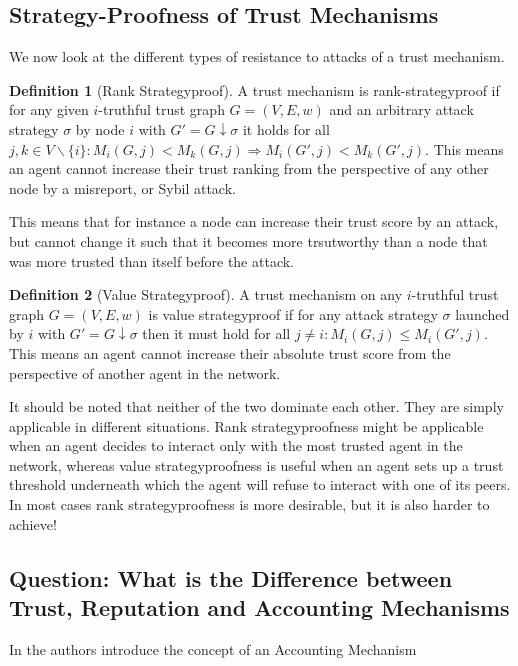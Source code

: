 \documentclass[11pt,a4paper]{article}
\theoremstyle{definition}
\newtheorem{definition}{Definition}[section]
\theoremstyle{theorem}
\theoremstyle{proposition}
\theoremstyle{corollary}
\theoremstyle{lemma}
\theoremstyle{example}
\theoremstyle{remark}
\begin{document}
\subsection{Strategy-Proofness of Trust Mechanisms}
\label{subsec:Strategy-Proofness of Trust Mechanisms}
We now look at the different types of resistance to attacks of a trust mechanism.
\begin{definition}[Rank Strategyproof]
A trust mechanism is rank-strategyproof if for any given $i$-truthful trust graph $G=(V,E,w)$ and an arbitrary attack strategy $\sigma$ by node $i$ with $G'=G\downarrow\sigma$ it holds for all $j,k\in{}V\backslash\{i\}: M_i(G,j)<M_k(G,j) \Rightarrow M_i(G',j)<M_k(G',j)$. This means an agent cannot increase their trust ranking from the perspective of any other node by a misreport, or Sybil attack.
\end{definition}
This means that for instance a node can increase their trust score by an attack, but cannot change it such that it becomes more trsutworthy than a node that was more trusted than itself before the attack. 

\begin{definition}[Value Strategyproof]
A trust mechanism on any $i$-truthful trust graph $G=(V,E,w)$ is value strategyproof if for any attack strategy $\sigma$ launched by $i$ with $G'=G\downarrow\sigma$ then it must hold for all $j\neq{}i: M_i(G,j)\leq{}M_i(G',j)$. This means an agent cannot increase their absolute trust score from the perspective of another agent in the network.
\end{definition}

\noindent{} It should be noted that neither of the two dominate each other. They are simply applicable in different situations. Rank strategyproofness might be applicable when an agent decides to interact only with the most trusted agent in the network, whereas value strategyproofness is useful when an agent sets up a trust threshold underneath which the agent will refuse to interact with one of its peers. In most cases rank strategyproofness is more desirable, but it is also harder to achieve!   

\subsection{Question: What is the Difference between Trust, Reputation and Accounting Mechanisms}
\label{subsec:Trust, Reputation, Accounting Mechanisms}
In \cite{On the Sybil-Proofness of Accounting Mechanisms} the authors introduce the concept of an Accounting Mechanism
\end{document}
